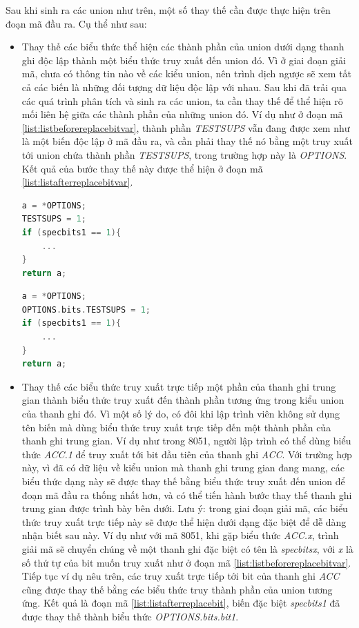 Sau khi sinh ra các union như trên, một số thay thế cần được thực hiện trên đoạn mã đầu ra. Cụ thể như sau:
\begin{itemize}
\item Thay thế các biểu thức thể hiện các thành phần của union dưới dạng thanh ghi độc lập thành một biểu thức truy xuất đến union đó. Vì ở giai đoạn giải mã, chưa có thông tin nào về các kiểu union, nên trình dịch ngược sẽ xem tất cả các biến là những đối tượng dữ liệu độc lập với nhau. Sau khi đã trải qua các quá trình phân tích và sinh ra các union, ta cần thay thế để thể hiện rõ mối liên hệ giữa các thành phần của những union đó. Ví dụ như ở đoạn mã \ref{list:listbeforereplacebitvar}, thành phần \textit{TESTSUPS} vẫn đang được xem như là một biến độc lập ở mã đầu ra, và cần phải thay thế nó bằng một truy xuất tới union chứa thành phần \textit{TESTSUPS}, trong trường hợp này là \textit{OPTIONS}. Kết quả của bước thay thế này được thể hiện ở đoạn mã \ref{list:listafterreplacebitvar}.
\begin{lstlisting}[caption={Mã đầu ra trước khi thực hiện các bước thay thế},label={list:listbeforereplacebitvar}, language = c]
a = *OPTIONS;
TESTSUPS = 1;
if (specbits1 == 1){
	...
}
return a;
\end{lstlisting}

\begin{lstlisting}[caption={Mã đầu ra sau khi thực hiện bước thay thế thành phần của union},label={list:listafterreplacebitvar}, language = c]
a = *OPTIONS;
OPTIONS.bits.TESTSUPS = 1;
if (specbits1 == 1){
	...
}
return a;
\end{lstlisting}
\item Thay thế các biểu thức truy xuất trực tiếp một phần của thanh ghi trung gian thành biểu thức truy xuất đến thành phần tương ứng trong kiểu union của thanh ghi đó. Vì một số lý do, có đôi khi lập trình viên không sử dụng tên biến mà dùng biểu thức truy xuất trực tiếp đến một thành phần của thanh ghi trung gian. Ví dụ như trong 8051, người lập trình có thể dùng biểu thức \textit{ACC.1 }để truy xuất tới bit đầu tiên của thanh ghi \textit{ACC}. Với trường hợp này, vì đã có dữ liệu về kiểu union mà thanh ghi trung gian đang mang, các biểu thức dạng này sẽ được thay thế bằng biểu thức truy xuất đến union để đoạn mã đầu ra thống nhất hơn, và có thể tiến hành bước thay thế thanh ghi trung gian được trình bày bên dưới. Lưu ý: trong giai đoạn giải mã, các biểu thức truy xuất trực tiếp này sẽ được thể hiện dưới dạng đặc biệt để dễ dàng nhận biết sau này. Ví dụ như với mã 8051, khi gặp biểu thức \textit{ACC.x}, trình giải mã sẽ chuyển chúng về một thanh ghi đặc biệt có tên là \textit{specbitsx}, với \textit{x} là số thứ tự của bit muốn truy xuất như ở đoạn mã \ref{list:listbeforereplacebitvar}. Tiếp tục ví dụ nêu trên, các truy xuất trực tiếp tới bit của thanh ghi \textit{ACC} cũng được thay thế bằng các biểu thức truy thành phần của union tương ứng. Kết quả là đoạn mã \ref{list:listafterreplacebit}, biến đặc biệt \textit{specbits1} đã được thay thế thành biểu thức \textit{OPTIONS.bits.bit1}.


\end{itemize}
